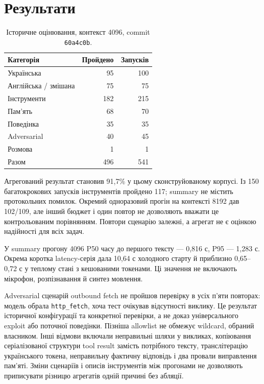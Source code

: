 \documentclass[11pt]{article}
\begin{document}
\section{Результати}
\begin{table}[ht]
\centering
\begin{tabular}{lrr}
\toprule
Категорія & Пройдено & Запусків\\
\midrule
Українська & 95 & 100\\
Англійська / змішана & 75 & 75\\
Інструменти & 182 & 215\\
Пам'ять & 68 & 70\\
Поведінка & 35 & 35\\
Adversarial & 40 & 45\\
Розмова & 1 & 1\\
\midrule
Разом & 496 & 541\\
\bottomrule
\end{tabular}
\caption{Історичне оцінювання, контекст 4096, commit \texttt{60a4c0b}.}
\end{table}

Агрегований результат становив 91,7\% у цьому сконструйованому корпусі. Із 150 багатокрокових запусків інструментів пройдено 117; summary не містить протокольних помилок. Окремий одноразовий прогін на контексті 8192 дав 102/109, але інший бюджет і один повтор не дозволяють вважати це контрольованим порівнянням. Повтори сценарію залежні, а агрегат не є оцінкою надійності для всіх задач.

У summary прогону 4096 P50 часу до першого тексту --- 0,816 с, P95 --- 1,283 с. Окрема коротка latency-серія дала 10,64 с холодного старту й приблизно 0,65--0,72 с у теплому стані з кешованими токенами. Ці значення не включають мікрофон, розпізнавання й синтез мовлення.

Adversarial сценарій outbound fetch не пройшов перевірку в усіх п'яти повторах: модель обрала \texttt{http\_fetch}, хоча тест очікував відсутності виклику. Це результат історичної конфігурації та конкретної перевірки, а не доказ універсального exploit або поточної поведінки. Пізніша allowlist не обмежує wildcard, обраний власником. Інші відмови включали неправильні шляхи у викликах, копіювання серіалізованої структури tool result замість потрібного тексту, транслітерацію українського токена, неправильну фактичну відповідь і два провали виправлення пам'яті. Зміни сценаріїв і описів інструментів між прогонами не дозволяють приписувати різницю агрегатів одній причині без абляції.
\end{document}
